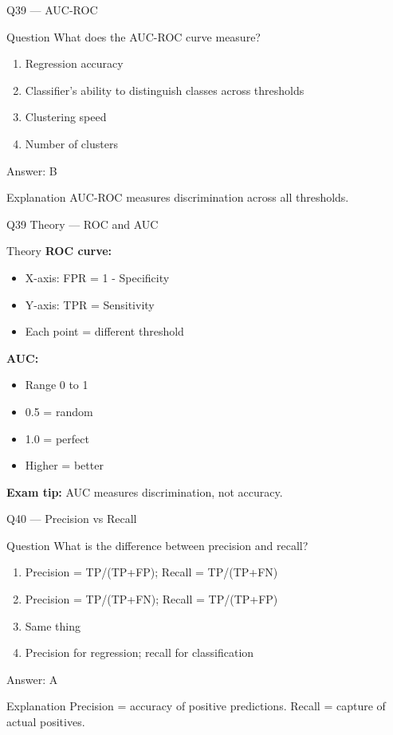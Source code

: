 \documentclass[aspectratio=169,8pt]{beamer}
\begin{document}
	\begin{frame}{Q39 --- AUC-ROC}
		\begin{block}{Question}
			What does the AUC-ROC curve measure?
		\end{block}
		\begin{enumerate}[label=\Alph*.]
			\item Regression accuracy
			\item Classifier's ability to distinguish classes across thresholds
			\item Clustering speed
			\item Number of clusters
		\end{enumerate}
		\begin{exampleblock}{Answer: B}
		\end{exampleblock}
		\begin{block}{Explanation}
			AUC-ROC measures discrimination across all thresholds.
		\end{block}
	\end{frame}
	
	\begin{frame}{Q39 Theory --- ROC and AUC}
		\begin{block}{Theory}
			\textbf{ROC curve:}
			\begin{itemize}
				\item X-axis: FPR = 1 - Specificity
				\item Y-axis: TPR = Sensitivity
				\item Each point = different threshold
			\end{itemize}
			\textbf{AUC:}
			\begin{itemize}
				\item Range 0 to 1
				\item 0.5 = random
				\item 1.0 = perfect
				\item Higher = better
			\end{itemize}
			\textbf{Exam tip:} AUC measures discrimination, not accuracy.
		\end{block}
	\end{frame}
	
	\begin{frame}{Q40 --- Precision vs Recall}
		\begin{block}{Question}
			What is the difference between precision and recall?
		\end{block}
		\begin{enumerate}[label=\Alph*.]
			\item Precision = TP/(TP+FP); Recall = TP/(TP+FN)
			\item Precision = TP/(TP+FN); Recall = TP/(TP+FP)
			\item Same thing
			\item Precision for regression; recall for classification
		\end{enumerate}
		\begin{exampleblock}{Answer: A}
		\end{exampleblock}
		\begin{block}{Explanation}
			Precision = accuracy of positive predictions. Recall = capture of actual positives.
		\end{block}
	\end{frame}
	
\end{document}
